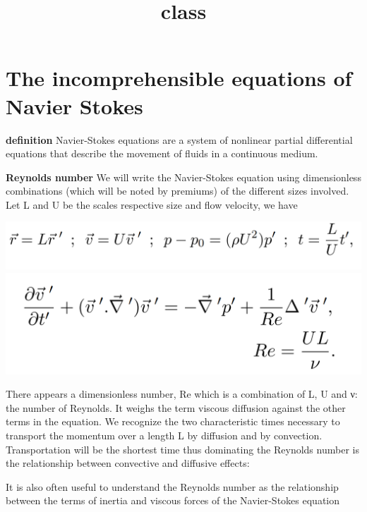 \documentclass[10pt]{beamer}
\title{class}
\begin{document}
\section{The incomprehensible equations of Navier Stokes}
\begin{frame}
\textbf{definition}
Navier-Stokes equations are a system of nonlinear partial differential equations that describe the movement of fluids in a continuous medium.

\textbf{Reynolds number}
We will write the Navier-Stokes equation using dimensionless combinations (which
will be noted by premiums) of the different sizes involved. Let L and U be the scales
respective size and flow velocity, we have

\includegraphics[scale=0.5]{images/equa1.png}
\includegraphics[scale=0.5]{images/equa2.png}
\begin{equation}

\end{equation}

There appears a dimensionless number, Re which is a combination of L, U and ν: the number of
Reynolds. It weighs the term viscous diffusion against the other terms in the equation.
We recognize the two characteristic times necessary to transport the momentum
over a length L by diffusion and by convection. Transportation will be the shortest time
thus dominating the Reynolds number is the relationship between convective and diffusive effects:

It is also often useful to understand the Reynolds number as the relationship between the terms
of inertia and viscous forces of the Navier-Stokes equation


\end{frame}
\end{document}
